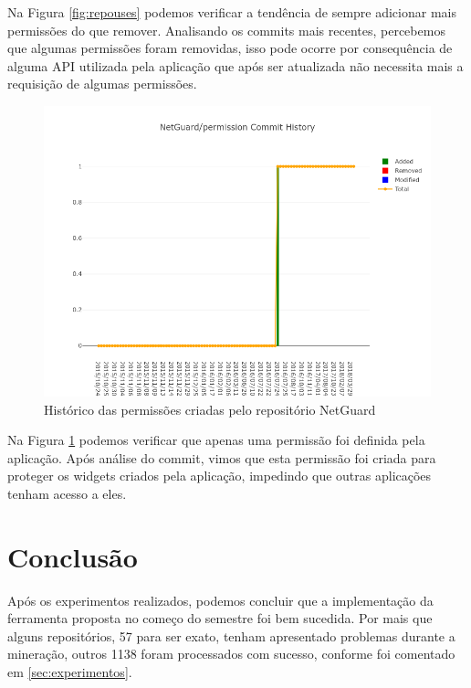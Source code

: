 \documentclass[a4paper,12pt]{article}
\begin{document}
{Na Figura \ref{fig:repouses} podemos verificar a tendência de sempre adicionar mais permissões do que remover. Analisando os commits mais recentes, percebemos que algumas permissões foram removidas, isso pode ocorre por consequência de alguma API utilizada pela aplicação que após ser atualizada não necessita mais a requisição de algumas permissões.

\begin{figure}[H]
\centering
\includegraphics[width=\linewidth,height=0.5\linewidth]{imgs/NetGuard_permission_history.png}
\caption{Histórico das permissões criadas pelo repositório NetGuard}
\label{fig:repopermission}
\end{figure}

Na Figura \ref{fig:repopermission} podemos verificar que apenas uma permissão foi definida pela aplicação. Após análise do commit, vimos que esta permissão foi criada para proteger os widgets criados pela aplicação, impedindo que outras aplicações tenham acesso a eles.


\newpage

\section{Conclusão}%

Após os experimentos realizados, podemos concluir que a implementação da ferramenta proposta no começo do semestre foi bem sucedida. Por mais que alguns repositórios, 57 para ser exato, tenham apresentado problemas durante a mineração, outros 1138 foram processados com sucesso, conforme foi comentado em \ref{sec:experimentos}.

}
\end{document}
